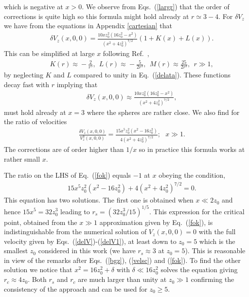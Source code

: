 which is negative at $x>0$. We observe from Eqs.~(\ref{largr}) that the order of corrections is quite high so this formula might hold already at $r\simeq 3-4$.
For $\delta V_z$ we have from the equations in Appendix \ref{cartesian} that
\begin{eqnarray}&&\!\!\!\!\!\!\!\!\!\!\!\!\!\!\!\!
\delta V_z(x, 0, 0)\! =\!\frac{10x z_0^2(16z_0^2\!-\!x^2)}{(x^2+4z_0^2)^{7/2}}(1+K(x)+L(x)). \label{delata}
\end{eqnarray}
This can be simplified at large $x$ following Ref.~\cite{batchelor_green_1972},
\begin{eqnarray}&&\!\!\!\!\!\!\!\!\!\!\!\!\!\!\!\!
K(r)\!\approx \!-\frac{2}{r^5},\ \ L(r)\!\approx \!-\frac{5}{2r^3},\ \ M(r)\!\approx \!\frac{25}{2r^3},\ \ r\gg 1, \label{dsf}
\end{eqnarray}
by neglecting $K$ and $L$ compared to unity in Eq.~(\ref{delata}). These functions decay fast with $r$ implying that
\begin{eqnarray}&&\!\!\!\!\!\!\!\!\!\!\!\!\!\!\!\!
\delta V_z(x, 0, 0)\!\approx \!\frac{10x z_0^2(16z_0^2\!-\!x^2)}{(x^2+4z_0^2)^{7/2}}, \label{velsc}
\end{eqnarray}
must hold already at $x=3$ where the spheres are rather close. We also find for the ratio of velocities
\begin{eqnarray}&&\!\!\!\!\!\!\!\!\!\!\!\!\!\!\!\!
\frac{\delta V_z(x, 0, 0)}{V^0_z(x, 0, 0)}\! =\!\frac{15x^5z_0^2(x^2\!-\!16z_0^2)}{4(x^2+4z_0^2)^{7/2}};\ \ \ x\gg 1.\label{fok}
\end{eqnarray}
The corrections are of order higher than $1/x$ so in practice this formula works at rather small $x$.

The ratio on the LHS of Eq.~(\ref{fok}) equals $-1$ at $x$ obeying the condition,
\begin{eqnarray}&&\!\!\!\!\!\!\!\!\!\!\!\!\!\!\!\!
15x^5z_0^2(x^2\!-\!16z_0^2)+4(x^2+4z_0^2)^{7/2}=0.
\label{critical_pts_eq}
\end{eqnarray}
This equation has two solutions. The first one is obtained when
$x \ll 2z_0$ and hence $15x^5 = 32 z_0^3$ leading to $r_s = (32 z_0^3/15)^{1/5}$. This expression for the critical point, obtained from the $x\gg 1$ approximation given by Eq.~(\ref{fok}), is indistinguishable from the numerical solution of $V_z(x, 0, 0)=0$ with the full velocity given by Eqs.~(\ref{delV})-(\ref{delV1}), at least down to $z_0=5$ which is the smallest $z_0$ considered in this work (we have $r_s\approx 3$ at $z_0=5$). This is reasonable in view of the remarks after Eqs.~(\ref{bgz}),  (\ref{velsc}) and (\ref{fok}). To find the other solution we notice that $x^2=16z_0^2+\delta$ with $\delta \ll 16z_0^2$ solves the equation giving $r_c \approx 4z_0$. Both $r_s$ and $r_c$ are much larger than unity at $z_0\gg 1$ confirming the consistency of the approach and can be used for $z_0\geq 5$.

